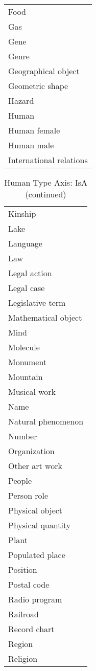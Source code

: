 \documentclass[letterpaper]{article}
\begin{document}
\begin{table*}[ht]
\begin{center}
\begin{tabular}{|l|}
Food\\
Gas\\
Gene\\
Genre\\
Geographical object\\
Geometric shape\\
Hazard\\
Human\\
Human female\\
Human male\\
International relations\\
\hline
\end{tabular}
\end{center}
\label{table:}
\end{table*}\begin{table*}[ht]
\caption{Human Type Axis: IsA (continued)}
\begin{center}
\begin{tabular}{|l|}\hline
Kinship\\
Lake\\
Language\\
Law\\
Legal action\\
Legal case\\
Legislative term\\
Mathematical object\\
Mind\\
Molecule\\
Monument\\
Mountain\\
Musical work\\
Name\\
Natural phenomenon\\
Number\\
Organization\\
Other art work\\
People\\
Person role\\
Physical object\\
Physical quantity\\
Plant\\
Populated place\\
Position\\
Postal code\\
Radio program\\
Railroad\\
Record chart\\
Region\\
Religion\\

\end{tabular}
\end{center}
\end{table*}
\end{document}
